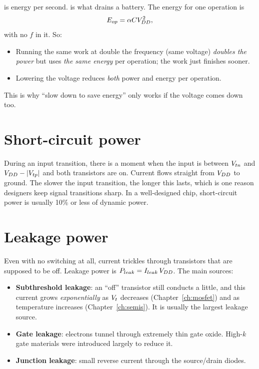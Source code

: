  is energy per second.  is what drains a battery. The energy for one operation is
\[
  E_{op} = \alpha C V_{DD}^2,
\]
with no $f$ in it. So:
\begin{itemize}
  \item Running the same work at double the frequency (same voltage) \emph{doubles the power} but uses \emph{the same energy} per operation; the work just finishes sooner.
  \item Lowering the voltage reduces \emph{both} power and energy per operation.
\end{itemize}
This is why ``slow down to save energy'' only works if the voltage comes down too.

\section{Short-circuit power}

During an input transition, there is a moment when the input is between $V_{tn}$ and $V_{DD} - |V_{tp}|$ and both transistors are on. Current flows straight from $V_{DD}$ to ground. The slower the input transition, the longer this lasts, which is one reason designers keep signal transitions sharp. In a well-designed chip, short-circuit power is usually 10\% or less of dynamic power.

\section{Leakage power}
\label{sec:leakage}

Even with no switching at all, current trickles through transistors that are supposed to be off. Leakage power is $P_{leak} = I_{leak}\,V_{DD}$. The main sources:

\begin{itemize}
  \item \textbf{Subthreshold leakage}: an ``off'' transistor still conducts a little, and this current grows \emph{exponentially} as $V_{t}$ decreases (Chapter~\ref{ch:mosfet}) and as temperature increases (Chapter~\ref{ch:semis}). It is usually the largest leakage source.
  \item \textbf{Gate leakage}: electrons tunnel through extremely thin gate oxide. High-$k$ gate materials were introduced largely to reduce it.
  \item \textbf{Junction leakage}: small reverse current through the source/drain diodes.
\end{itemize}

